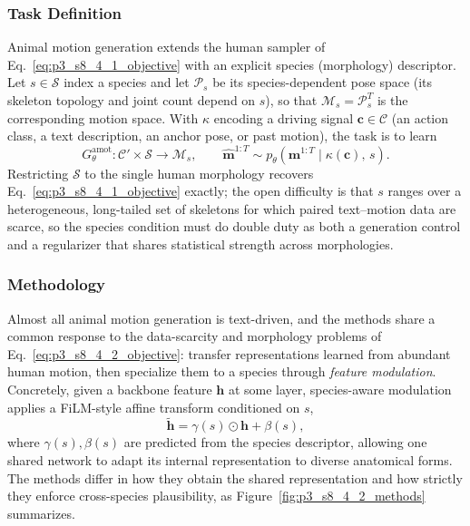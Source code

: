 \subsubsection{Task Definition}
\label{subsubsec:p3_s8_4_2_task}
Animal motion generation extends the human sampler of Eq.~\eqref{eq:p3_s8_4_1_objective} with an explicit species (morphology) descriptor. Let $s\in\mathcal{S}$ index a species and let $\mathcal{P}_s$ be its species-dependent pose space (its skeleton topology and joint count depend on $s$), so that $\mathcal{M}_s=\mathcal{P}_s^{T}$ is the corresponding motion space. With $\kappa$ encoding a driving signal $\mathbf{c}\in\mathcal{C}$ (an action class, a text description, an anchor pose, or past motion), the task is to learn
\begin{equation}
\label{eq:p3_s8_4_2_objective}
G_\theta^{\text{amot}}:\mathcal{C}'\!\times\!\mathcal{S}\!\to\!\mathcal{M}_s,\qquad
\hat{\mathbf{m}}^{1:T}\sim p_\theta\!\left(\mathbf{m}^{1:T}\mid\kappa(\mathbf{c}),\,s\right).
\end{equation}
Restricting $\mathcal{S}$ to the single human morphology recovers Eq.~\eqref{eq:p3_s8_4_1_objective} exactly; the open difficulty is that $s$ ranges over a heterogeneous, long-tailed set of skeletons for which paired text--motion data are scarce, so the species condition must do double duty as both a generation control and a regularizer that shares statistical strength across morphologies.


\subsubsection{Methodology}
\label{subsubsec:p3_s8_4_2_method}
Almost all animal motion generation is text-driven, and the methods share a common response to the data-scarcity and morphology problems of Eq.~\eqref{eq:p3_s8_4_2_objective}: transfer representations learned from abundant human motion, then specialize them to a species through \emph{feature modulation}. Concretely, given a backbone feature $\mathbf{h}$ at some layer, species-aware modulation applies a FiLM-style affine transform conditioned on $s$,
\begin{equation}
\label{eq:p3_s8_4_2_modulation}
\tilde{\mathbf{h}}=\gamma(s)\odot\mathbf{h}+\beta(s),
\end{equation}
where $\gamma(s),\beta(s)$ are predicted from the species descriptor, allowing one shared network to adapt its internal representation to diverse anatomical forms. The methods differ in how they obtain the shared representation and how strictly they enforce cross-species plausibility, as Figure~\ref{fig:p3_s8_4_2_methods} summarizes.

